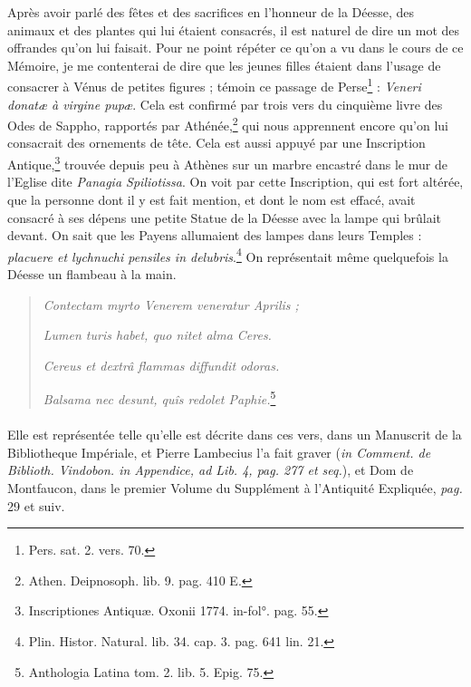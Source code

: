 \documentclass[a4paper, 18pt, oneside]{article}
\begin{document}
Après avoir parlé des fêtes et des sacrifices en l'honneur de la Déesse, des animaux et des plantes qui lui étaient consacrés, il est naturel de dire un mot des offrandes qu'on lui faisait. Pour ne point répéter ce qu'on a vu dans le cours de ce Mémoire, je me contenterai de dire que les jeunes filles étaient dans l'usage de consacrer à Vénus de petites figures ; témoin ce passage de Perse\footnote{Pers. sat. 2. vers. 70.} : \emph{Veneri donatæ à virgine pupæ}. Cela est confirmé par trois vers du cinquième livre des Odes de Sappho, rapportés par Athénée,\footnote{Athen. Deipnosoph. lib. 9. pag. 410 E.} qui nous apprennent encore qu'on lui consacrait des ornements de tête. Cela est aussi appuyé par une Inscription Antique,\footnote{Inscriptiones Antiquæ. Oxonii 1774. in-fol°. pag. 55.} trouvée depuis peu à Athènes sur un marbre encastré dans le mur de l'Eglise dite \emph{Panagia Spiliotissa}. On voit par cette Inscription, qui est fort altérée, que la personne dont il y est fait mention, et dont le nom est effacé, avait consacré à ses dépens une petite Statue de la Déesse avec la lampe qui brûlait devant. On sait que les Payens allumaient des lampes dans leurs Temples : \emph{placuere et lychnuchi pensiles in delubris}.\footnote{Plin. Histor. Natural. lib. 34. cap. 3. pag. 641 lin. 21.} On représentait même quelquefois la Déesse un flambeau à la main.
\begin{quotation}
\emph{Contectam myrto Venerem veneratur Aprilis ;}

\hspace*{5mm}\emph{Lumen turis habet, quo nitet alma Ceres.}

\emph{Cereus et dextrâ flammas diffundit odoras.}

\hspace*{5mm}\emph{Balsama nec desunt, quîs redolet Paphie.}\footnote{Anthologia Latina tom. 2. lib. 5. Epig. 75.}
\end{quotation}
\paragraph{}
Elle est représentée telle qu'elle est décrite dans ces vers, dans un Manuscrit de la Bibliotheque Impériale, et Pierre Lambecius l'a fait graver (\emph{in Comment. de Biblioth. Vindobon. in Appendice, ad Lib. 4, pag. 277 et seq.}), et Dom de Montfaucon, dans le premier Volume du Supplément à l'Antiquité Expliquée, \emph{pag.} 29 et suiv.
\end{document}
